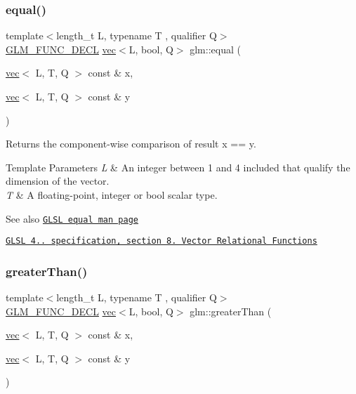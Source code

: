 \subsubsection{\texorpdfstring{equal()}{equal()}}
{\footnotesize\ttfamily template$<$length\+\_\+t L, typename T , qualifier Q$>$ \\
\mbox{\hyperlink{setup_8hpp_ab2d052de21a70539923e9bcbf6e83a51}{G\+L\+M\+\_\+\+F\+U\+N\+C\+\_\+\+D\+E\+CL}} \mbox{\hyperlink{structglm_1_1vec}{vec}}$<$L, bool, Q$>$ glm\+::equal (\begin{DoxyParamCaption}\item[{\mbox{\hyperlink{structglm_1_1vec}{vec}}$<$ L, T, Q $>$ const \&}]{x,  }\item[{\mbox{\hyperlink{structglm_1_1vec}{vec}}$<$ L, T, Q $>$ const \&}]{y }\end{DoxyParamCaption})}

Returns the component-\/wise comparison of result x == y.


\begin{DoxyTemplParams}{Template Parameters}
{\em L} & An integer between 1 and 4 included that qualify the dimension of the vector. \\
\hline
{\em T} & A floating-\/point, integer or bool scalar type.\\
\hline
\end{DoxyTemplParams}
\begin{DoxySeeAlso}{See also}
\href{http://www.opengl.org/sdk/docs/manglsl/xhtml/equal.xml}{\tt G\+L\+SL equal man page} 

\href{http://www.opengl.org/registry/doc/GLSLangSpec.4.20.8.pdf}{\tt G\+L\+SL 4.. specification, section 8. Vector Relational Functions} 
\end{DoxySeeAlso}
\mbox{\label{group__core__func__vector__relational_gad3a3a7d228da3754c328c9a778f6df56}} 
\subsubsection{\texorpdfstring{greater\+Than()}{greaterThan()}}
{\footnotesize\ttfamily template$<$length\+\_\+t L, typename T , qualifier Q$>$ \\
\mbox{\hyperlink{setup_8hpp_ab2d052de21a70539923e9bcbf6e83a51}{G\+L\+M\+\_\+\+F\+U\+N\+C\+\_\+\+D\+E\+CL}} \mbox{\hyperlink{structglm_1_1vec}{vec}}$<$L, bool, Q$>$ glm\+::greater\+Than (\begin{DoxyParamCaption}\item[{\mbox{\hyperlink{structglm_1_1vec}{vec}}$<$ L, T, Q $>$ const \&}]{x,  }\item[{\mbox{\hyperlink{structglm_1_1vec}{vec}}$<$ L, T, Q $>$ const \&}]{y }\end{DoxyParamCaption})}

